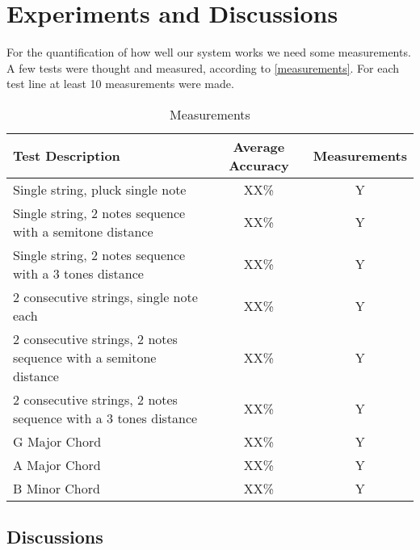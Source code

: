 \chapter{Experiments and Discussions}

For the quantification of how well our system works we need some measurements.
A few tests were thought and measured, according to \autoref{measurements}.
For each test line at least 10 measurements were made.

\begin{table}[htb]
  \begin{center}
    \ABNTEXreducedfont
    \caption[Measurements]{Measurements}
    \label{measurements}
    \begin{tabular}{p{10cm}|c|c}
      \hline
      Test Description & Average Accuracy & Measurements\\
      \hline \hline
      Single string, pluck single note & XX\% & Y\\ \hline
      Single string, 2 notes sequence with a semitone distance & XX\% & Y \\ \hline
      Single string, 2 notes sequence with a 3 tones distance & XX\% & Y \\ \hline
      2 consecutive strings, single note each & XX\% & Y \\ \hline
      2 consecutive strings, 2 notes sequence with a semitone distance & XX\% & Y \\ \hline
      2 consecutive strings, 2 notes sequence with a 3 tones distance & XX\% & Y \\ \hline
      G Major Chord & XX\% & Y \\ \hline
      A Major Chord & XX\% & Y \\ \hline
      B Minor Chord & XX\% & Y \\ \hline
      \hline
    \end{tabular}
  \end{center}
\end{table}

\section{Discussions}



